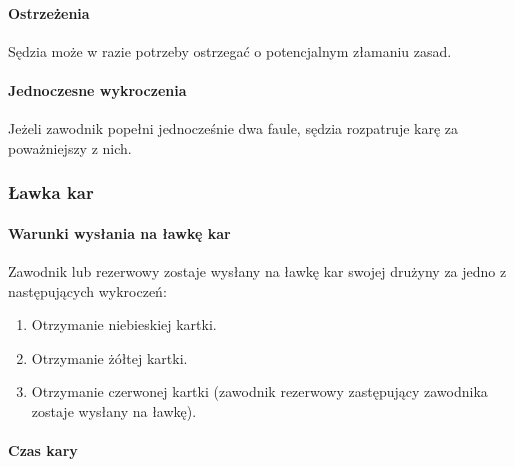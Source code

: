\documentclass[12pt]{article}
\begin{document}
\paragraph{Ostrzeżenia}
Sędzia może w razie potrzeby ostrzegać
o potencjalnym złamaniu zasad.

\paragraph{Jednoczesne wykroczenia}
Jeżeli zawodnik popełni
jednocześnie dwa faule, sędzia rozpatruje karę za poważniejszy z nich.

\subsubsection{Ławka kar}

\paragraph{Warunki wysłania na ławkę kar}
Zawodnik lub rezerwowy
zostaje wysłany na ławkę kar swojej drużyny za jedno z następujących
wykroczeń:

\begin{enumerate}
\item Otrzymanie niebieskiej kartki.

\item Otrzymanie żółtej kartki.

\item Otrzymanie czerwonej kartki (zawodnik rezerwowy zastępujący zawodnika
zostaje wysłany na ławkę).
\end{enumerate}

\paragraph{Czas kary}
\end{document}
